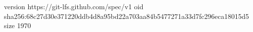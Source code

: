version https://git-lfs.github.com/spec/v1
oid sha256:68c27d30e371220ddb4d8a95bd22a703aa84b5477271a33d7fc296eca18015d5
size 1970
